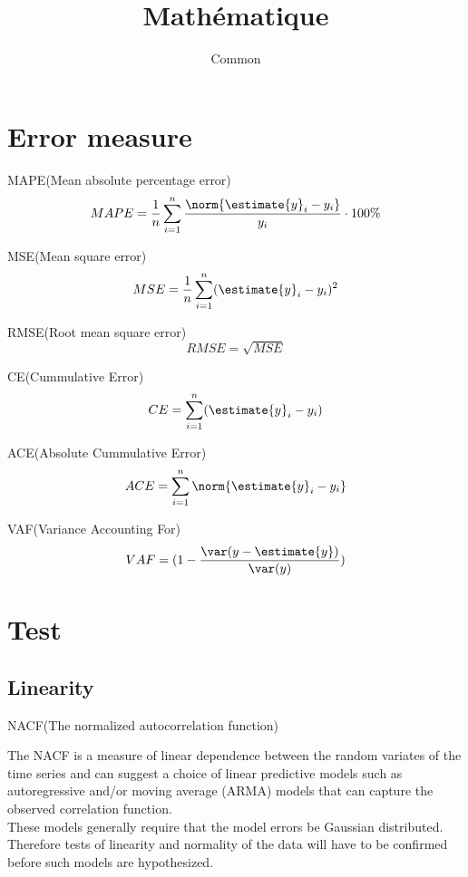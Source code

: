 \documentclass{article}
\begin{document}
\title{Math\'ematique}
\author{Common}
\maketitle
\tableofcontents
\newpage
\section{Error measure}
MAPE(Mean absolute percentage error)
$$ MAPE = \dfrac{1}{n} \sum_{i=1}^n \dfrac{\norm{\estimate{y}_i - y_i}}{y_i} \cdot 100\%$$

MSE(Mean square error)
$$MSE = \dfrac{1}{n} \sum_{i=1}^n (\estimate{y}_i - y_i)^2$$

RMSE(Root mean square error)
$$RMSE  = \sqrt{MSE}$$

CE(Cummulative Error)
$$CE = \sum_{i=1}^n (\estimate{y}_i - y_i)$$

ACE(Absolute Cummulative Error)
$$ACE = \sum_{i=1}^n \norm{\estimate{y}_i - y_i}$$

VAF(Variance Accounting For)
$$VAF = (1 - \dfrac{\var(y - \estimate{y})}{\var(y)})$$

\section{Test}
\subsection{Linearity}
NACF(The normalized autocorrelation function)

The NACF is a measure of linear dependence between the random variates of the time series and can suggest a choice of linear predictive models 
such as autoregressive and/or moving average (ARMA) models that can capture the observed correlation function.\\
These models generally require that the model errors be Gaussian distributed. 
Therefore tests of linearity and normality of the data will have to be confirmed before such models are hypothesized.
\end{document}
